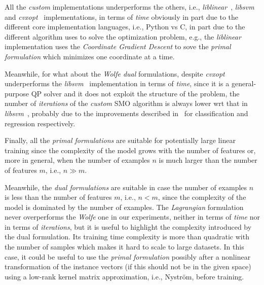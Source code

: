 \bigskip

All the \emph{custom} implementations underperforms the others, i.e., \emph{liblinear}~\cite{fan2008liblinear}, \emph{libsvm}~\cite{chang2011libsvm} and \emph{cvxopt}~\cite{vandenberghe2010cvxopt} implementations, in terms of \emph{time} obviously in part due to the different core implementation languages, i.e., Python vs C, in part due to the different algorithm uses to solve the  optimization problem, e.g., the \emph{liblinear}~\cite{fan2008liblinear} implementation uses the \emph{Coordinate Gradient Descent} to sove the \emph{primal formulation} which minimizes one coordinate at a time.

Meanwhile, for what about the \emph{Wolfe dual} formulations, despite \emph{cvxopt}~\cite{vandenberghe2010cvxopt} underperforms the \emph{libsvm}~\cite{chang2011libsvm} implementation in terms of \emph{time}, since it is a general-purpose QP solver and it does not exploit the structure of the problem, the number of \emph{iterations} of the \emph{custom} SMO algorithm is always lower wrt that in \emph{libsvm}~\cite{chang2011libsvm}, probably due to the improvements described in~\cite{keerthi2001improvements, shevade1999improvements} for classification and regression respectively.

\bigskip

Finally, all the \emph{primal formulations} are suitable for potentially large linear training since the complexity of the model grows with the number of features or, more in general, when the number of examples $n$ is much larger than the number of features $m$, i.e., $n \gg m$.

Meanwhile, the \emph{dual formulations} are suitable in case the number of examples $n$ is less than the number of features $m$, i.e., $n < m$, since the complexity of the model is dominated by the number of examples. The \emph{Lagrangian} formulation never overperforms the \emph{Wolfe} one in our experiments, neither in terms of \emph{time} nor in terms of \emph{iterations}, but it is useful to highlight the complexity introduced by the dual formulation. Its training time complexity is more than quadratic with the number of samples which makes it hard to scale to large datasets. In this case, it could be useful to use the \emph{primal formulation} possibly after a nonlinear transformation of the instance vectors (if this should not be in the given space) using a low-rank kernel matrix approximation, i.e., Nyström, before training.